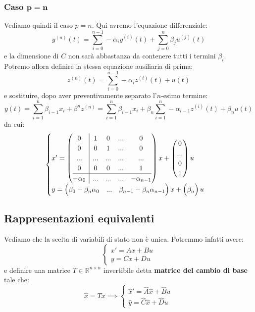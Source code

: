 \documentclass[a4paper,11pt]{article}
\begin{document}
\subsubsection{Caso $\mathbf{p = n}$}
Vediamo quindi il caso $p = n$. 
Qui avremo l'equazione differenziale:
$$
y^{(n)} (t) = \sum_{i=0}^{n-1} - \alpha_i y^{(i)}(t) + \sum_{j=0}^n \beta_j u^{(j)}(t)
$$
e la dimensione di $C$ non sarà abbastanza da contenere tutti i termini $\beta_i$.
Potremo allora definire la stessa equazione ausiliaria di prima:
$$
z^{(n)}(t) = \sum_{i = 0}^{n - 1} -\alpha_i z^{(i)}(t) + u(t)
$$
e sostituire, dopo aver preventivamente separato l'$n$-esimo termine:
$$
y(t) = \sum_{i = 1}^n \beta_{i - 1} x_i + \beta^n z^{(n)} = \sum_{i = 1}^n \beta_{i - 1} x_i + \beta_n \sum_{i = 1}^{n} -\alpha_{i - 1} z^{(i)}(t) + \beta_n u(t)
$$
da cui:
\[
	\begin{cases}	
x' = \left(\begin{array}{@{}c | cccc@{}}
	0 & 1 & 0 & ... & 0 \\
	0 & 0 & 1 & ... & 0 \\
	... & ... & ... & ... & ... \\
	0 & 0 & 0 & ... & 1 \\
	\hline
	-\alpha_0 & ... & ... & ... & -\alpha_{n - 1}
\end{array}\right)
x + \begin{pmatrix}
0 \\
... \\
0 \\
1
\end{pmatrix} u \\ 
y = \begin{pmatrix}
	\beta_0 - \beta_n \alpha_0 & ... & \beta_{n - 1} - \beta_n \alpha_{n - 1}	
\end{pmatrix} x + \begin{pmatrix}
\beta_n
\end{pmatrix} u
	\end{cases}
\]

\subsection{Rappresentazioni equivalenti}
Vediamo che la scelta di variabili di stato non è unica.
Potremmo infatti avere:
\[
	\begin{cases}
		x' = Ax + Bu \\
		y = Cx + Du
	\end{cases}
\]
e definire una matrice $T \in \mathbb{R}^{n \times n}$ invertibile detta \textbf{matrice del cambio di base} tale che:
$$
\hat{x} = Tx \implies 
\begin{cases}
	\hat{x}' = \hat{A}\hat{x} + \hat{B}u \\
	\hat{y} = \hat{C}\hat{x} + \hat{D}u
\end{cases}
$$
\end{document}
